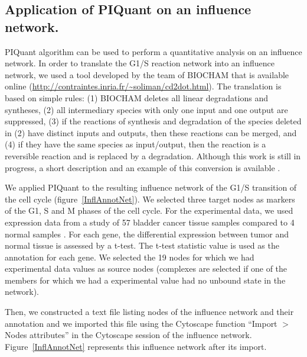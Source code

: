 \documentclass[10pt]{bmc_article}
\newenvironment{bmcformat}{\baselineskip20pt\sloppy\setboolean{publ}{false}}{\baselineskip20pt\sloppy}
\begin{document}
\begin{bmcformat}
\subsection*{Application of PIQuant on an influence network.}
PIQuant algorithm can be used to perform a quantitative analysis on an influence
network. In order to translate the G1/S reaction network into an influence network, we used
a tool developed by the team of BIOCHAM \cite{calzone2006biocham} that is
available online (\url{http://contraintes.inria.fr/~soliman/cd2dot.html}). The
translation is based on simple rules: (1) BIOCHAM deletes all linear
degradations and syntheses, (2) all intermediary species with only one input and
one output are suppressed, (3) if the reactions of synthesis and degradation of
the species deleted in (2) have distinct inputs and outputs, then these reactions
can be merged, and (4) if they have the same species as input/output, then the reaction is a
reversible reaction and is replaced by a degradation. Although this work is
still in progress, a short description and an example of this conversion is
available \cite{calzone2011calamar}.

We applied PIQuant to the resulting influence network of the G1/S transition of
the cell cycle (figure~\ref{InflAnnotNet}). We selected three target nodes as
markers of the G1, S and M
phases of the cell cycle. For the experimental data, we used expression data
from a study of 57 bladder cancer
tissue samples compared to 4 normal samples \cite{stransky2006regional}. For
each gene, the differential expression between tumor and normal tissue
is assessed by a t-test. The t-test statistic value is used as the annotation
for each gene. We selected the 19 nodes for which we had experimental data
values as source nodes (complexes are selected if one of the members for which
we had a experimental value had no unbound state in the network).

Then, we constructed a text file listing nodes of the influence network 
and their annotation and we imported this file using the Cytoscape function 
``Import $>$ Nodes attributes'' 
in the Cytoscape session of the influence network.
Figure~\ref{InflAnnotNet} represents this influence network after its import.
 


\end{bmcformat}
\end{document}

